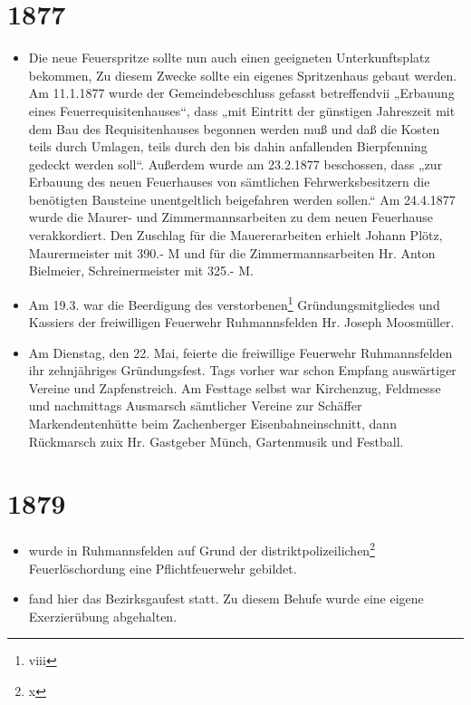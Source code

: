 \documentclass[12pt,a4paper]{book}
\begin{document}
\section*{1877}

\begin{itemize}
\item Die neue Feuerspritze sollte nun auch einen geeigneten
Unterkunftsplatz bekommen, Zu diesem Zwecke sollte ein eigenes
Spritzenhaus gebaut werden. Am 11.1.1877 wurde der Gemeindebeschluss
gefasst betreffendvii „Erbauung eines Feuerrequisitenhauses“, dass „mit
Eintritt der günstigen Jahreszeit mit dem Bau des Requisitenhauses
begonnen werden muß und daß die Kosten teils durch Umlagen, teils durch
den bis dahin anfallenden Bierpfenning gedeckt werden soll“. Außerdem
wurde am 23.2.1877 beschossen, dass „zur Erbauung des neuen Feuerhauses
von sämtlichen Fehrwerksbesitzern die benötigten Bausteine unentgeltlich
beigefahren werden sollen.“ Am 24.4.1877 wurde die Maurer- und
Zimmermannsarbeiten zu dem neuen Feuerhause verakkordiert. Den Zuschlag
für die Mauererarbeiten erhielt Johann Plötz, Maurermeister mit 390.- M
und für die Zimmermannsarbeiten Hr. Anton Bielmeier, Schreinermeister
mit 325.- M.

\item Am 19.3. war die Beerdigung des verstorbenen\footnote{viii}
Gründungsmitgliedes und Kassiers der freiwilligen Feuerwehr
Ruhmannsfelden Hr. Joseph Moosmüller.

\item Am Dienstag, den 22. Mai, feierte die freiwillige Feuerwehr
Ruhmannsfelden ihr zehnjähriges Gründungsfest. Tags vorher war schon
Empfang auswärtiger Vereine und Zapfenstreich. Am Festtage selbst war
Kirchenzug, Feldmesse und nachmittags Ausmarsch sämtlicher Vereine zur
Schäffer Markendentenhütte beim Zachenberger Eisenbahneinschnitt, dann
Rückmarsch zuix Hr. Gastgeber Münch, Gartenmusik und Festball.
\end{itemize}

\section*{1879}

\begin{itemize}
\item wurde in Ruhmannsfelden auf Grund der
distriktpolizeilichen\footnote{x} Feuerlöschordung eine Pflichtfeuerwehr
gebildet.

\item fand hier das Bezirksgaufest statt. Zu diesem Behufe wurde eine
eigene Exerzierübung abgehalten.
\end{itemize}
\end{document}

